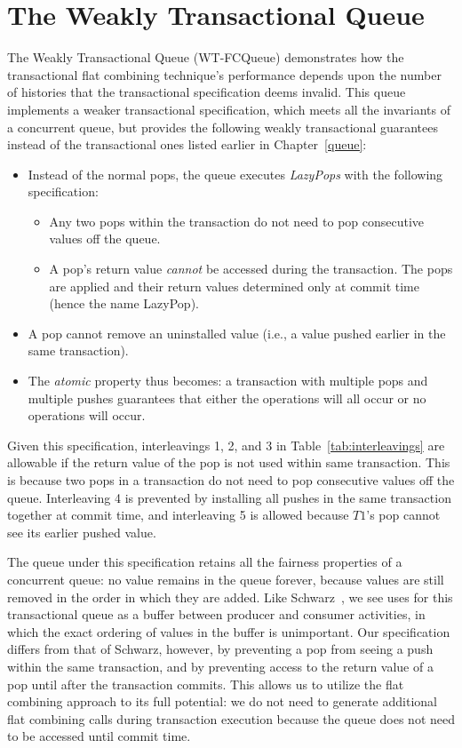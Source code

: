 \section{The Weakly Transactional Queue} 

The Weakly Transactional Queue (WT-FCQueue) demonstrates how the transactional flat combining technique's performance depends upon the number of histories that the transactional specification deems invalid. This queue implements a weaker transactional specification, which meets all the invariants of a concurrent queue, but provides the following weakly transactional guarantees instead of the transactional ones listed earlier in Chapter~\ref{queue}:
\begin{itemize}
    \item Instead of the normal pops, the queue executes \emph{LazyPops} with the following specification:
        \begin{itemize}
            \item Any two pops within the transaction do not need to pop consecutive values off the queue.
            \item A pop's return value \emph{cannot} be accessed during the transaction. The pops are applied and their return values determined only at commit time (hence the name LazyPop). 
        \end{itemize}
    \item A pop cannot remove an uninstalled value (i.e., a value pushed earlier in the same transaction).
    \item The \emph{atomic} property thus becomes: a transaction with multiple pops and multiple pushes guarantees that either the operations will all occur or no operations will occur.
\end{itemize}

Given this specification, interleavings 1, 2, and 3 in Table~\ref{tab:interleavings} are allowable if the return value of the pop is not used within same transaction. This is because two pops in a transaction do not need to pop consecutive values off the queue. Interleaving 4 is prevented by installing all pushes in the same transaction together at commit time, and interleaving 5 is allowed because $T1$'s pop cannot see its earlier pushed value.

The queue under this specification retains all the fairness properties of a concurrent queue: no value remains in the queue forever, because values are still removed in the order in which they are added. Like Schwarz~\cite{schwarz}, we see uses for this transactional queue as a buffer between producer and consumer activities, in which the exact ordering of values in the buffer is unimportant.
Our specification differs from that of Schwarz, however, by preventing a pop from seeing a push within the same transaction, and by preventing access to the return value of a pop until after the transaction commits. This allows us to utilize the flat combining approach to its full potential: we do not need to generate additional flat combining calls during transaction execution because the queue does not need to be accessed until commit time.

